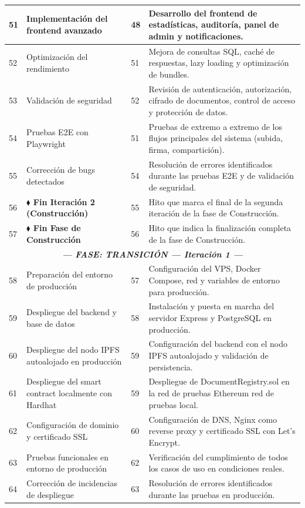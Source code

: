 \documentclass[11pt, a4paper]{article}
\begin{document}
\begin{longtable}{|p{1cm}|p{5.5cm}|p{1.5cm}|p{5.5cm}|}
\hline
51 & Implementación del frontend avanzado & 48 & Desarrollo del frontend de estadísticas, auditoría, panel de admin y notificaciones. \\
\hline
52 & Optimización del rendimiento & 51 & Mejora de consultas SQL, caché de respuestas, lazy loading y optimización de bundles. \\
\hline
53 & Validación de seguridad & 52 & Revisión de autenticación, autorización, cifrado de documentos, control de acceso y protección de datos. \\
\hline
54 & Pruebas E2E con Playwright & 51 & Pruebas de extremo a extremo de los flujos principales del sistema (subida, firma, compartición). \\
\hline
55 & Corrección de bugs detectados & 54 & Resolución de errores identificados durante las pruebas E2E y de validación de seguridad. \\
\hline
56 & \textbf{$\blacklozenge$ Fin Iteración 2 (Construcción)} & 55 & Hito que marca el final de la segunda iteración de la fase de Construcción. \\
\hline
57 & \textbf{$\blacklozenge$ Fin Fase de Construcción} & 56 & Hito que indica la finalización completa de la fase de Construcción. \\
\hline
\multicolumn{4}{|c|}{\textit{\textbf{--- FASE: TRANSICIÓN --- Iteración 1 ---}}} \\
\hline
58 & Preparación del entorno de producción & 57 & Configuración del VPS, Docker Compose, red y variables de entorno para producción. \\
\hline
59 & Despliegue del backend y base de datos & 58 & Instalación y puesta en marcha del servidor Express y PostgreSQL en producción. \\
\hline
60 & Despliegue del nodo IPFS autoalojado en producción & 59 & Configuración del backend con el nodo IPFS autoalojado y validación de persistencia. \\
\hline
61 & Despliegue del smart contract localmente con Hardhat & 59 & Despliegue de DocumentRegistry.sol en la red de pruebas Ethereum red de pruebas local. \\
\hline
62 & Configuración de dominio y certificado SSL & 60 & Configuración de DNS, Nginx como reverse proxy y certificado SSL con Let's Encrypt. \\
\hline
63 & Pruebas funcionales en entorno de producción & 62 & Verificación del cumplimiento de todos los casos de uso en condiciones reales. \\
\hline
64 & Corrección de incidencias de despliegue & 63 & Resolución de errores identificados durante las pruebas en producción. \\

\end{longtable}
\end{document}
